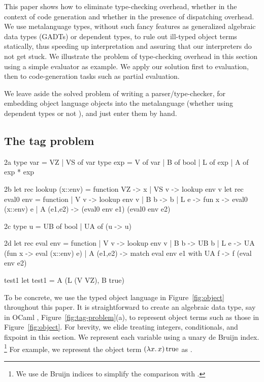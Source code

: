 This paper shows how to eliminate type-checking overhead, whether in the
context of code generation and whether in the presence of dispatching
overhead.  We use metalanguage types, without such fancy features as
generalized algebraic data types (GADTs) or dependent types, to rule out
ill-typed object terms statically,
thus speeding up interpretation and assuring that our interpreters
do not get stuck.  We illustrate the problem of type-checking overhead
in this section using a simple evaluator as example.  We apply our
solution first to evaluation, then to code\hyp generation tasks such as
partial evaluation.

\ifshort
We leave aside the solved problem of writing a parser\slash type\hyp checker,
for embedding object language objects into the metalanguage
(whether using dependent types \citep{WalidICFP02} or not \citep{baars-typing}),
and just enter them by hand.
\fi

\subsection{The tag problem}\label{tagproblem}

\begin{SaveVerbatim}{2a}
type var = VZ | VS of var
type exp = V of var | B of bool | L of exp | A of exp * exp
\end{SaveVerbatim}
\begin{SaveVerbatim}[commandchars=\@\{\}]{2b}
let rec lookup (x::env) = function VZ -> x | VS v -> lookup env v
let rec eval0 env = function
| V v       -> lookup env v
| B b       -> b 
| L e       -> fun x -> eval0 (x::env) e
| A (e1,e2) -> (eval0 env e1) (eval0 env e2) 
\end{SaveVerbatim}
\begin{SaveVerbatim}{2c}
type u = UB of bool | UA of (u -> u)
\end{SaveVerbatim}
\begin{SaveVerbatim}{2d}
let rec eval env = function
| V v       -> lookup env v
| B b       -> UB b
| L e       -> UA (fun x -> eval (x::env) e)
| A (e1,e2) -> match eval env e1 with UA f -> f (eval env e2)
\end{SaveVerbatim}
\begin{SaveVerbatim}{test1}
let test1 = A (L (V VZ), B true)
\end{SaveVerbatim}

To be concrete, we use the typed object language in
Figure~\ref{fig:object} throughout this paper.
It is straightforward to create an algebraic data type, say in OCaml%
\ifshort, Figure~\ref{fig:tag-problem}(a)\fi, to
represent object terms such as those in Figure~\ref{fig:object}.
For brevity, we elide treating integers, conditionals, and fixpoint in
this section.
\ifshort\else{}\fi
We represent each variable using a unary de Bruijn index.%
\footnote{We use de Bruijn indices to simplify the comparison with
\citet{WalidICFP02}.}
For example, we represent the object term $(\mathopen{\lambda\mathord{x}.\,}x)\mathinner{\mathrm{true}}$ as
\ifshort {}.\else {}\fi
\ifshort

